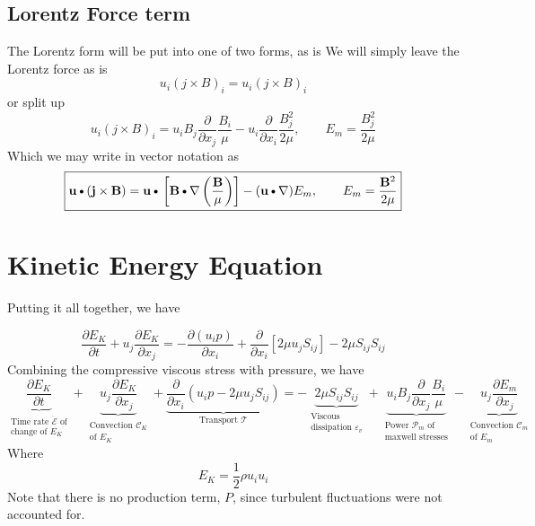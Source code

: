 \documentclass[11pt]{article}
\newcommand{\B}{\mathbf{B}}
\newcommand{\PD}{\partial}
\newcommand{\MC}{\mathcal}
\newcommand{\BM}{\frac{\mathbf{B}}{\mu}}
\newcommand{\J}{\mathbf{j}}
\newcommand{\U}{\mathbf{u}}
\newcommand{\DOT}{\text{\textbullet}}
\begin{document}
\subsection{Lorentz Force term}
The Lorentz form will be put into one of two forms, as is
We will simply leave the Lorentz force as is
\begin{equation}
	\boxed{
	u_i (j \times B)_i = u_i (j \times B)_i
	}
\end{equation}
or split up
\begin{equation}
	\boxed{
	u_i (j \times B)_i
	= u_i B_j \frac{\PD}{\PD x_j} \frac{B_i}{\mu} - u_i \frac{\PD}{\PD x_i} \frac{B_j^2}{2 \mu}
	, \qquad E_m = \frac{B_j^2}{2 \mu}
	}
\end{equation}
Which we may write in vector notation as
\begin{equation}
	\boxed{
	\U \DOT (\J \times \B) = \U \DOT \left[\B \DOT \nabla \left( \BM \right) \right] - (\U \DOT \nabla) E_m
	,\qquad
	E_m = \frac{\B^2}{2 \mu}
	}
\end{equation}

\section{Kinetic Energy Equation}
Putting it all together, we have

\begin{equation}
	\frac{\PD E_K}{\PD t} + 
	u_j \frac{\PD E_K}{\PD x_j} = 
	- \frac{\PD (u_i p)}{\PD x_i} + 
	\frac{\PD}{\PD x_i} \left[ 2 \mu u_j S_{ij} \right] - 
	2 \mu S_{ij} S_{ij}
\end{equation}
Combining the compressive viscous stress with pressure, we have
\begin{equation}
	\boxed{
	\underbrace{\frac{\PD E_K}{\PD t}}_{\substack{\text{Time rate $\dot{\MC E}$ of} \\ \text{change of $E_K$}}} + 
	\underbrace{u_j \frac{\PD E_K}{\PD x_j}}_
	{\substack{\text{Convection } \MC C_K \\\text{of $E_K$}}}
	+ \underbrace{\frac{\PD}{\PD x_i} \left( u_i p - 2 \mu u_j S_{ij} \right)}_{\text{Transport } \MC T} = 
	- \underbrace{2 \mu S_{ij} S_{ij}}_{\substack{\text{Viscous } \\ \text{dissipation } \varepsilon_v}}
	+ \underbrace{u_i B_j \frac{\PD}{\PD x_j} \frac{B_i}{\mu}}_
	{\substack{\text{Power $\MC P_{m}$ of}\\\text{maxwell stresses}}}
	- \underbrace{u_j \frac{\PD E_m}{\PD x_j}}_
	{\substack{\text{Convection $\MC C_m$}\\\text{of $E_m$}}}
	}
\end{equation}
Where
\begin{equation}
	E_K = \frac{1}{2} \rho u_i u_i
\end{equation}
Note that there is no production term, $P$, since turbulent fluctuations were not accounted for.
\end{document}
